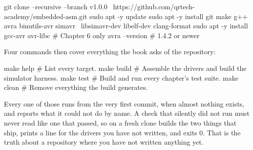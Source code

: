 \begin{shell}
git clone --recursive --branch v1.0.0 \
          https://github.com/qrtech-academy/embedded-asm.git
sudo apt -y update
sudo apt -y install git make g++ avra binutils-avr simavr \
                    libsimavr-dev libelf-dev clang-format
sudo apt -y install gcc-avr avr-libc  # Chapter 6 only
avra --version                        # 1.4.2 or newer
\end{shell}

\noindent Four commands then cover everything the book asks of the repository:

\begin{shell}
make help                # List every target.
make build               # Assemble the drivers and build the simulator harness.
make test                # Build and run every chapter's test suite.
make clean               # Remove everything the build generates.
\end{shell}

\noindent Every one of those runs from the very first commit, when almost nothing exists, and
reports what it could not do by name. A check that silently did not run must never read like one
that passed, so \code{make build} on a fresh clone builds the two things that ship, prints a
\code{SKIP} line for the drivers you have not written, and exits 0. That is the truth about a
repository where you have not written anything yet.
